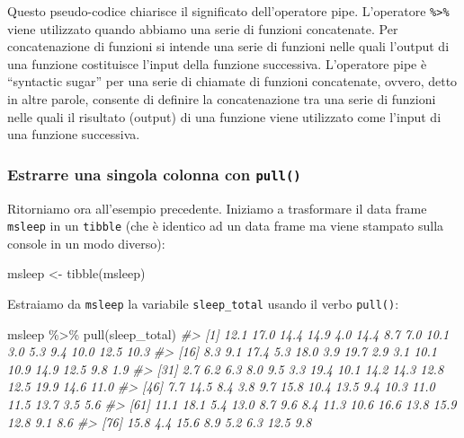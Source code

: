 \documentclass[
  10pt,
  italian,
  a4paper,
  extrafontsizes,onecolumn,openright
  ]{memoir}
\newenvironment{Shaded}{\begin{snugshade}}{\end{snugshade}}
\newcommand{\CommentTok}[1]{\textcolor[rgb]{0.56,0.35,0.01}{\textit{#1}}}
\newcommand{\FunctionTok}[1]{\textcolor[rgb]{0.00,0.00,0.00}{#1}}
\newcommand{\NormalTok}[1]{#1}
\newcommand{\OtherTok}[1]{\textcolor[rgb]{0.56,0.35,0.01}{#1}}
\newcommand{\SpecialCharTok}[1]{\textcolor[rgb]{0.00,0.00,0.00}{#1}}
\begin{document}
Questo pseudo-codice chiarisce il significato dell'operatore pipe. L'operatore \texttt{\%\textgreater{}\%} viene utilizzato quando abbiamo una serie di funzioni concatenate. Per concatenazione di funzioni si intende una serie di funzioni nelle quali l'output di una funzione costituisce l'input della funzione successiva. L'operatore pipe è ``syntactic sugar'' per una serie di chiamate di funzioni concatenate, ovvero, detto in altre parole, consente di definire la concatenazione tra una serie di funzioni nelle quali il risultato (output) di una funzione viene utilizzato come l'input di una funzione successiva.

\hypertarget{estrarre-una-singola-colonna-con-pull}{%
\subsubsection{\texorpdfstring{Estrarre una singola colonna con \texttt{pull()}}{Estrarre una singola colonna con pull()}}\label{estrarre-una-singola-colonna-con-pull}}

Ritorniamo ora all'esempio precedente. Iniziamo a trasformare il data frame \texttt{msleep} in un \texttt{tibble} (che è identico ad un data frame ma viene stampato sulla console in un modo diverso):

\begin{Shaded}
\begin{Highlighting}[]
\NormalTok{msleep }\OtherTok{\textless{}{-}} \FunctionTok{tibble}\NormalTok{(msleep)}
\end{Highlighting}
\end{Shaded}

\noindent 
Estraiamo da \texttt{msleep} la variabile \texttt{sleep\_total} usando il verbo \texttt{pull()}:

\begin{Shaded}
\begin{Highlighting}[]
\NormalTok{msleep }\SpecialCharTok{\%\textgreater{}\%} 
  \FunctionTok{pull}\NormalTok{(sleep\_total)}
\CommentTok{\#\textgreater{}  [1] 12.1 17.0 14.4 14.9  4.0 14.4  8.7  7.0 10.1  3.0  5.3  9.4 10.0 12.5 10.3}
\CommentTok{\#\textgreater{} [16]  8.3  9.1 17.4  5.3 18.0  3.9 19.7  2.9  3.1 10.1 10.9 14.9 12.5  9.8  1.9}
\CommentTok{\#\textgreater{} [31]  2.7  6.2  6.3  8.0  9.5  3.3 19.4 10.1 14.2 14.3 12.8 12.5 19.9 14.6 11.0}
\CommentTok{\#\textgreater{} [46]  7.7 14.5  8.4  3.8  9.7 15.8 10.4 13.5  9.4 10.3 11.0 11.5 13.7  3.5  5.6}
\CommentTok{\#\textgreater{} [61] 11.1 18.1  5.4 13.0  8.7  9.6  8.4 11.3 10.6 16.6 13.8 15.9 12.8  9.1  8.6}
\CommentTok{\#\textgreater{} [76] 15.8  4.4 15.6  8.9  5.2  6.3 12.5  9.8}
\end{Highlighting}
\end{Shaded}
\end{document}
